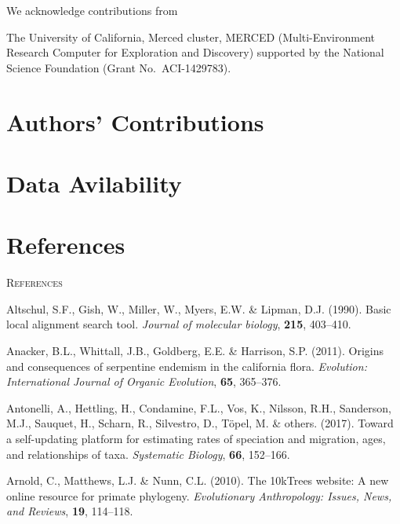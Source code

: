 \documentclass[]{article}
\begin{document}
We acknowledge contributions from

The University of California, Merced cluster, MERCED (Multi-Environment Research Computer for Exploration and Discovery) supported by the National Science Foundation (Grant No.~ACI-1429783).

\hypertarget{authors-contributions}{%
\section{Authors' Contributions}\label{authors-contributions}}

\hypertarget{data-avilability}{%
\section{Data Avilability}\label{data-avilability}}

\hypertarget{references}{%
\section{References}\label{references}}

\newpage
\begin{center}
\textsc{References}
\end{center}

\hypertarget{refs}{}
\leavevmode\hypertarget{ref-altschul1990basic}{}%
Altschul, S.F., Gish, W., Miller, W., Myers, E.W. \& Lipman, D.J. (1990). Basic local alignment search tool. \emph{Journal of molecular biology}, \textbf{215}, 403--410.

\leavevmode\hypertarget{ref-anacker2011origins}{}%
Anacker, B.L., Whittall, J.B., Goldberg, E.E. \& Harrison, S.P. (2011). Origins and consequences of serpentine endemism in the california flora. \emph{Evolution: International Journal of Organic Evolution}, \textbf{65}, 365--376.

\leavevmode\hypertarget{ref-antonelli2017toward}{}%
Antonelli, A., Hettling, H., Condamine, F.L., Vos, K., Nilsson, R.H., Sanderson, M.J., Sauquet, H., Scharn, R., Silvestro, D., Töpel, M. \& others. (2017). Toward a self-updating platform for estimating rates of speciation and migration, ages, and relationships of taxa. \emph{Systematic Biology}, \textbf{66}, 152--166.

\leavevmode\hypertarget{ref-arnold201010ktrees}{}%
Arnold, C., Matthews, L.J. \& Nunn, C.L. (2010). The 10kTrees website: A new online resource for primate phylogeny. \emph{Evolutionary Anthropology: Issues, News, and Reviews}, \textbf{19}, 114--118.
\end{document}
